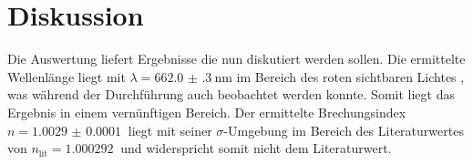 
\section{Diskussion}
\label{sec:Diskussion}
Die Auswertung liefert Ergebnisse die nun diskutiert werden sollen. Die ermittelte Wellenlänge liegt mit $\lambda = \SI{662.0(3)}{\nano\meter}$ im Bereich des roten sichtbaren Lichtes \cite{sichtbaresSpektrum}, was während der Durchführung auch beobachtet werden konnte. Somit liegt das Ergebnis in einem vernünftigen Bereich. Der ermittelte Brechungsindex $n= \SI{1.0029(1)}{}$ liegt mit seiner $\sigma$-Umgebung im Bereich des Literaturwertes von $n_\text{lit}=\SI{1.000 292}{}$ \cite{nLuft} und widerspricht somit nicht dem Literaturwert.